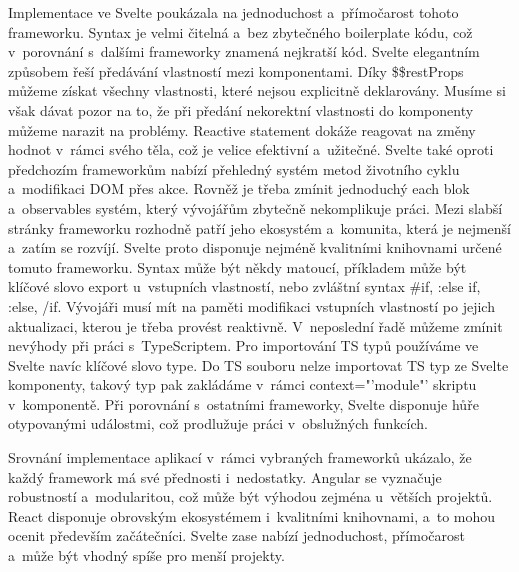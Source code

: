 Implementace ve Svelte poukázala na jednoduchost a~přímočarost tohoto frameworku. 
Syntax je velmi čitelná a~bez zbytečného boilerplate kódu, což v~porovnání s~dalšími frameworky znamená nejkratší kód. 
Svelte elegantním způsobem řeší předávání vlastností mezi komponentami. 
Díky \$\$restProps můžeme získat všechny vlastnosti, které nejsou explicitně deklarovány. 
Musíme si však dávat pozor na to, že při předání nekorektní vlastnosti do komponenty můžeme narazit na problémy. 
Reactive statement dokáže reagovat na změny hodnot v~rámci svého těla, což je velice efektivní a~užitečné. 
Svelte také oproti předchozím frameworkům nabízí přehledný systém metod životního cyklu a~modifikaci DOM přes akce. 
Rovněž je třeba zmínit jednoduchý each blok a~observables systém, který vývojářům zbytečně nekomplikuje práci.
Mezi slabší stránky frameworku rozhodně patří jeho ekosystém a~komunita, která je nejmenší a~zatím se rozvíjí. 
Svelte proto disponuje nejméně kvalitními knihovnami určené tomuto frameworku. 
Syntax může být někdy matoucí, příkladem může být klíčové slovo export u~vstupních vlastností, nebo zvláštní syntax \#if, :else if, :else, /if. 
Vývojáři musí mít na paměti modifikaci vstupních vlastností po jejich aktualizaci, kterou je třeba provést reaktivně. 
V~neposlední řadě můžeme zmínit nevýhody při práci s~TypeScriptem. Pro importování TS typů používáme ve Svelte navíc klíčové slovo type. 
Do TS souboru nelze importovat TS typ ze Svelte komponenty, takový typ pak zakládáme v~rámci context="'module"' skriptu v~komponentě.
Při porovnání s~ostatními frameworky, Svelte disponuje hůře otypovanými událostmi, což prodlužuje práci v~obslužných funkcích.


Srovnání implementace aplikací v~rámci vybraných frameworků ukázalo, že každý framework má své přednosti i~nedostatky. 
Angular se vyznačuje robustností a~modularitou, což může být výhodou zejména u~větších projektů. 
React disponuje obrovským ekosystémem i~kvalitními knihovnami, a~to mohou ocenit především začátečníci. 
Svelte zase nabízí jednoduchost, přímočarost a~může být vhodný spíše pro menší projekty.